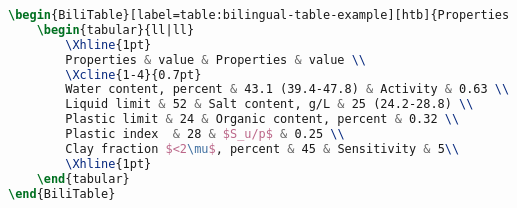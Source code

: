 \begin{lstlisting}[language=LaTeX, caption=Bilingual Table Example, label=listing:bilingual-table-example]
\begin{BiliTable}[label=table:bilingual-table-example][htb]{Properties of Skabo clay}{Skabo 黏土的物理特性}[table:bilingual-table-example]     
    \begin{tabular}{ll|ll}
        \Xhline{1pt}
        Properties & value & Properties & value \\
        \Xcline{1-4}{0.7pt}
        Water content, percent & 43.1 (39.4-47.8) & Activity & 0.63 \\
        Liquid limit & 52 & Salt content, g/L & 25 (24.2-28.8) \\
        Plastic limit & 24 & Organic content, percent & 0.32 \\
        Plastic index  & 28 & $S_u/p$ & 0.25 \\
        Clay fraction $<2\mu$, percent & 45 & Sensitivity & 5\\
        \Xhline{1pt}
    \end{tabular}
\end{BiliTable}
\end{lstlisting}
